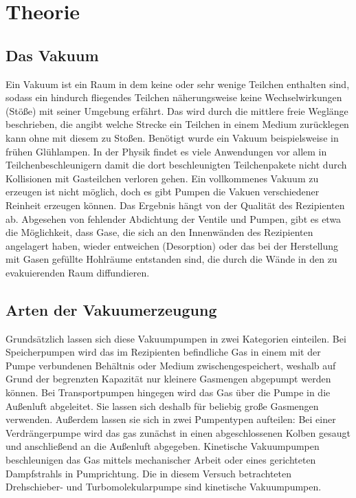 
\section{Theorie}
\label{sec:Theorie}

\subsection{Das Vakuum}
Ein Vakuum ist ein Raum in dem keine oder sehr wenige Teilchen enthalten sind, sodass ein hindurch fliegendes Teilchen näherungsweise keine Wechselwirkungen (Stöße) mit seiner Umgebung erfährt. Das wird durch die mittlere freie Weglänge beschrieben, die angibt welche Strecke ein Teilchen in einem Medium zurücklegen kann ohne mit diesem zu Stoßen. Benötigt wurde ein Vakuum beispielsweise in frühen Glühlampen. In der Physik findet es viele Anwendungen vor allem in Teilchenbeschleunigern damit die dort beschleunigten Teilchenpakete nicht durch Kollisionen mit Gasteilchen verloren gehen.
Ein vollkommenes Vakuum zu erzeugen ist nicht möglich, doch es gibt Pumpen die Vakuen verschiedener Reinheit erzeugen können. Das Ergebnis hängt von der Qualität des Rezipienten ab. Abgesehen von fehlender Abdichtung der Ventile und Pumpen, gibt es etwa die Möglichkeit, dass Gase, die sich an den Innenwänden des Rezipienten angelagert haben, wieder entweichen (Desorption) oder das bei der Herstellung mit Gasen gefüllte Hohlräume entstanden sind, die durch die Wände in den zu evakuierenden Raum diffundieren.
\subsection{Arten der Vakuumerzeugung}
Grundsätzlich lassen sich diese Vakuumpumpen in zwei Kategorien einteilen.
Bei Speicherpumpen wird das im Rezipienten befindliche Gas in einem mit der Pumpe verbundenen Behältnis oder Medium zwischengespeichert, weshalb auf Grund der begrenzten Kapazität nur kleinere Gasmengen abgepumpt werden können.
Bei Transportpumpen hingegen wird das Gas über die Pumpe in die Außenluft abgeleitet. Sie lassen sich deshalb für beliebig große Gasmengen verwenden.\cite{Jena} 
Außerdem lassen sie sich in zwei Pumpentypen aufteilen:\newline
Bei einer Verdrängerpumpe wird das gas zunächst in einen abgeschlossenen Kolben gesaugt und anschließend an die Außenluft abgegeben.\newline
Kinetische Vakuumpumpen beschleunigen das Gas mittels mechanischer Arbeit oder eines gerichteten Dampfstrahls in Pumprichtung\cite{Pfeiffer}.
Die in diesem Versuch betrachteten Drehschieber- und Turbomolekularpumpe sind kinetische Vakuumpumpen.
